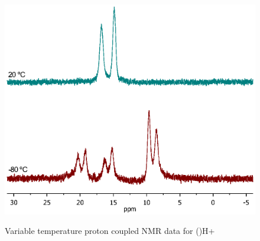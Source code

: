{\begin{figure}[htp]
\begin{center}
\vspace{0.5cm}
\includegraphics[scale = 0.8, trim = 0cm 8cm 0.5cm 10cm, clip]{../NMR/Coupledstacked.eps}
\caption[Variable temperature proton coupled \phosphorus{} NMR spectra for (\tButhixantphos)H+]{Variable temperature proton coupled \phosphorus{} NMR data for (\tButhixantphos)H+}
\vspace{0.2cm}
\label{VTStBuHcoupled}
\end{center}
\end{figure}  
\vspace{0.2cm}




}
